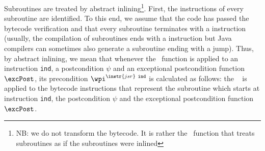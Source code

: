\begin{itemize}
Subroutines are treated by abstract inlining\footnote{NB: we do not transform the bytecode. It is rather the \wpi \
 function that treats subroutines as if the subroutines were inlined}. First, the instructions of every subroutine
 are identified. %
To this end, we assume that the code has passed the bytecode verification and that every subroutine terminates with a  
instruction (usually, the compilation of subroutines ends with a \instr{ret} instruction but Java 
compilers can sometimes also generate a subroutine ending with a jump). Thus, by abstract inlining, we mean that
 whenever the \wpi~function is applied to an instruction \instr{jsr}  \texttt{ind}, a postcondition $\psi$ and an exceptional postcondition function $\excPost$, its precondition  $\wpi^{\instr{jsr} \ \tt{ind}}$ is calculated as follows:
the \wpi~ is applied to the bytecode instructions that represent the subroutine which starts at instruction \texttt{ind},
 the postcondition $\psi$ and the exceptional postcondition function  $\excPost$.
  
\end{itemize}
